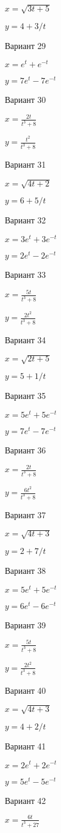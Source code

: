 \documentclass[11pt]{report}
\begin{document}
$x = \sqrt{3 t + 5}$

$y = 4 + 3 / t$

Вариант 29

$x = e^{t} + e^{- t}$

$y = 7 e^{t} - 7 e^{- t}$

Вариант 30

$x = \frac{2 t}{t^{3} + 8}$

$y = \frac{t^{2}}{t^{3} + 8}$

Вариант 31

$x = \sqrt{4 t + 2}$

$y = 6 + 5 / t$

Вариант 32

$x = 3 e^{t} + 3 e^{- t}$

$y = 2 e^{t} - 2 e^{- t}$

Вариант 33

$x = \frac{5 t}{t^{3} + 8}$

$y = \frac{2 t^{2}}{t^{3} + 8}$

Вариант 34

$x = \sqrt{2 t + 5}$

$y = 5 + 1 / t$

Вариант 35

$x = 5 e^{t} + 5 e^{- t}$

$y = 7 e^{t} - 7 e^{- t}$

Вариант 36

$x = \frac{2 t}{t^{3} + 8}$

$y = \frac{6 t^{2}}{t^{3} + 8}$

Вариант 37

$x = \sqrt{4 t + 3}$

$y = 2 + 7 / t$

Вариант 38

$x = 5 e^{t} + 5 e^{- t}$

$y = 6 e^{t} - 6 e^{- t}$

Вариант 39

$x = \frac{5 t}{t^{3} + 8}$

$y = \frac{2 t^{2}}{t^{3} + 8}$

Вариант 40

$x = \sqrt{4 t + 3}$

$y = 4 + 2 / t$

Вариант 41

$x = 2 e^{t} + 2 e^{- t}$

$y = 5 e^{t} - 5 e^{- t}$

Вариант 42

$x = \frac{6 t}{t^{3} + 27}$
\end{document}
